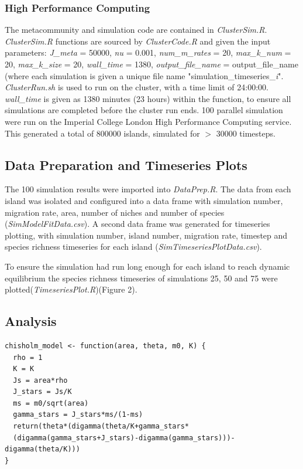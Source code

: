 \subsubsection{High Performance Computing}
The metacommunity and simulation code are contained in \textit{ClusterSim.R}. \textit{ClusterSim.R} functions are sourced by \textit{ClusterCode.R} and given the input parameters: \textit{J\_meta} = 50000, \textit{nu} = 0.001, \textit{num\_m\_rates} = 20, \textit{max\_k\_num} = 20, \textit{max\_k\_size} = 20, \textit{wall\_time} = 1380, \textit{output\_file\_name} = output\_file\_name (where each simulation is given a unique file name "simulation\_timeseries\_\textit{i}". \textit{ClusterRun.sh} is used to run on the cluster, with a time limit of 24:00:00. \textit{wall\_time} is given as 1380 minutes (23 hours) within the function, to ensure all simulations are completed before the cluster run ends. 100 parallel simulation were run on the Imperial College London High Performance Computing service. This generated a total of 800000 islands, simulated for $>$ 30000 timesteps.   

\subsection{Data Preparation and Timeseries Plots}
The 100 simulation results were imported into \textit{DataPrep.R}. The data from each island was isolated and configured into a data frame with simulation number, migration rate, area, number of niches and number of species (\textit{SimModelFitData.csv}). A second data frame was generated for timeseries plotting, with simulation number, island number, migration rate, timestep and species richness timeseries for each island (\textit{SimTimeseriesPlotData.csv}).\bigskip

\noindent To ensure the simulation had run long enough for each island to reach dynamic equilibrium the species richness timeseries of simulations 25, 50 and 75 were plotted(\textit{TimeseriesPlot.R})(Figure 2).

\subsection{Analysis}\bigskip

\begin{verbatim}
chisholm_model <- function(area, theta, m0, K) {
  rho = 1
  K = K
  Js = area*rho
  J_stars = Js/K
  ms = m0/sqrt(area)
  gamma_stars = J_stars*ms/(1-ms)
  return(theta*(digamma(theta/K+gamma_stars*
  (digamma(gamma_stars+J_stars)-digamma(gamma_stars)))-digamma(theta/K)))
}
\end{verbatim}

